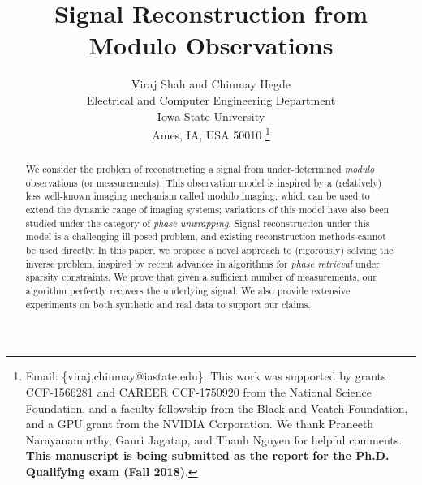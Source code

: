 \documentclass[10pt]{article}
\begin{document}
\title{Signal Reconstruction from Modulo Observations}

\author{
	Viraj Shah and Chinmay Hegde \\
	Electrical and Computer Engineering Department \\
	Iowa State University \\
	Ames, IA, USA 50010
	\thanks{Email: \{viraj,chinmay@iastate.edu\}. This work was supported by grants CCF-1566281 and CAREER CCF-1750920 from the National Science Foundation, and a faculty fellowship from the Black and Veatch Foundation, and a GPU grant from the NVIDIA Corporation.	
	We thank Praneeth Narayanamurthy, Gauri Jagatap, and Thanh Nguyen for helpful comments. \textbf{This manuscript is being submitted as the report for the Ph.D. Qualifying exam (Fall 2018)}. 
}
}


\maketitle

\begin{abstract}
	We consider the problem of reconstructing a signal from under-determined \emph{modulo} observations (or measurements). This observation model is inspired by a (relatively) less well-known imaging mechanism called modulo imaging, which can be used to extend the dynamic range of imaging systems; variations of this model have also been studied under the category of \emph{phase unwrapping}. Signal reconstruction under this model is a challenging ill-posed problem, and existing reconstruction methods cannot be used directly. In this paper, we propose a novel approach to (rigorously) solving the inverse problem, inspired by recent advances in algorithms for \emph{phase retrieval} under sparsity constraints. We prove that given a sufficient number of measurements, our algorithm perfectly recovers the underlying signal. We also provide extensive experiments on both synthetic and real data to support our claims. 
\end{abstract}







%
%
%


%
%
\end{document}
